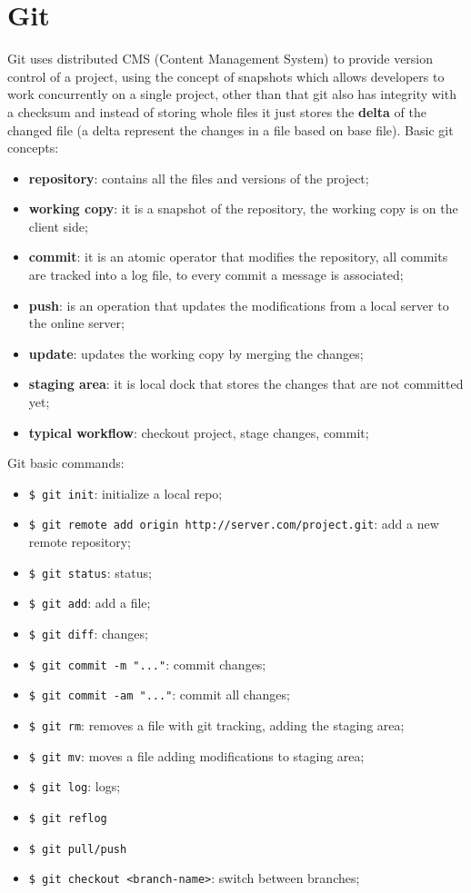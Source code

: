\documentclass[12pt]{article}
\begin{document}
\newpage
\section{Git}
Git uses distributed CMS (Content Management System) to provide version control of a project, using the concept of snapshots which allows developers to work concurrently on a single project, other than that git also has integrity with a checksum and instead of storing whole files it just stores the \textbf{delta} of the changed file (a delta represent the changes in a file based on base file). Basic git concepts:
\begin{itemize}
  \item \textbf{repository}: contains all the files and versions of the project;
  \item \textbf{working copy}: it is a snapshot of the repository, the working copy is on the client side;
  \item \textbf{commit}: it is an atomic operator that modifies the repository, all commits are tracked into a log file, to every commit a message is associated;
  \item \textbf{push}: is an operation that updates the modifications from a local server to the online server;
  \item \textbf{update}: updates the working copy by merging the changes;
  \item \textbf{staging area}: it is local dock that stores the changes that are not committed yet;
  \item \textbf{typical workflow}: checkout project, stage changes, commit;
\end{itemize}
Git basic commands: 
\begin{itemize}
  \item \texttt{\$ git init}: initialize a local repo;
  \item \texttt{\$ git remote add origin http://server.com/project.git}: add a new remote repository;
  \item \texttt{\$ git status}: status;
  \item \texttt{\$ git add}: add a file;
  \item \texttt{\$ git diff}: changes;
  \item \texttt{\$ git commit -m "..."}: commit changes;
  \item \texttt{\$ git commit -am "..."}: commit all changes;
  \item \texttt{\$ git rm}: removes a file with git tracking, adding the staging area;
  \item \texttt{\$ git mv}: moves a file adding modifications to staging area;
  \item \texttt{\$ git log}: logs;
  \item \texttt{\$ git reflog}
  \item \texttt{\$ git pull/push}
  \item \texttt{\$ git checkout <branch-name>}: switch between branches;
\end{itemize}
\end{document}
